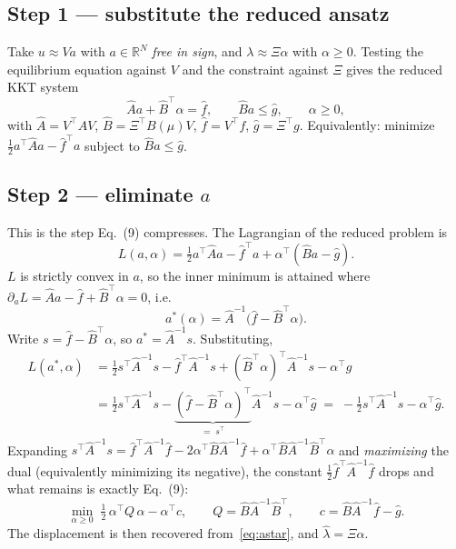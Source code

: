 \documentclass[11pt,a4paper]{article}
\newcommand{\R}{\mathbb{R}}
\begin{document}
\subsection*{Step 1 --- substitute the reduced ansatz}
Take $u\approx Va$ with $a\in\R^{N}$ \emph{free in sign}, and $\lambda\approx\Xi\alpha$
with $\alpha\ge0$. Testing the equilibrium equation against $V$ and the constraint against
$\Xi$ gives the reduced KKT system
\begin{equation}
\hat A a + \hat B^{\!\top}\alpha = \hat f,
\qquad \hat B a \le \hat g,
\qquad \alpha\ge0,
\label{eq:redKKT}
\end{equation}
with $\hat A=V^{\!\top}\!AV$, $\hat B=\Xi^{\!\top}\!B(\mu)V$, $\hat f=V^{\!\top}\!f$,
$\hat g=\Xi^{\!\top}g$. Equivalently: minimize $\tfrac12a^{\!\top}\hat Aa-\hat f^{\!\top}a$
subject to $\hat Ba\le\hat g$.

\subsection*{Step 2 --- eliminate $a$}
This is the step Eq.~(9) compresses. The Lagrangian of the reduced problem is
\begin{equation}
L(a,\alpha)=\tfrac12a^{\!\top}\hat Aa-\hat f^{\!\top}a+\alpha^{\!\top}(\hat Ba-\hat g).
\end{equation}
$L$ is strictly convex in $a$, so the inner minimum is attained where
$\partial_a L=\hat Aa-\hat f+\hat B^{\!\top}\alpha=0$, i.e.
\begin{equation}
a^{*}(\alpha)=\hat A^{-1}\bigl(\hat f-\hat B^{\!\top}\alpha\bigr).
\label{eq:astar}
\end{equation}
Write $s=\hat f-\hat B^{\!\top}\alpha$, so $a^{*}=\hat A^{-1}s$. Substituting,
\begin{align}
L(a^{*},\alpha)
&=\tfrac12 s^{\!\top}\hat A^{-1}s-\hat f^{\!\top}\hat A^{-1}s+(\hat B^{\!\top}\alpha)^{\!\top}\hat A^{-1}s-\alpha^{\!\top}\hat g \nonumber\\
&=\tfrac12 s^{\!\top}\hat A^{-1}s-\underbrace{(\hat f-\hat B^{\!\top}\alpha)^{\!\top}}_{=\;s^{\top}}\hat A^{-1}s-\alpha^{\!\top}\hat g
\;=\;-\tfrac12 s^{\!\top}\hat A^{-1}s-\alpha^{\!\top}\hat g .
\end{align}
Expanding $s^{\!\top}\hat A^{-1}s
=\hat f^{\!\top}\hat A^{-1}\hat f-2\alpha^{\!\top}\hat B\hat A^{-1}\hat f+\alpha^{\!\top}\hat B\hat A^{-1}\hat B^{\!\top}\alpha$
and \emph{maximizing} the dual (equivalently minimizing its negative), the constant
$\tfrac12\hat f^{\!\top}\hat A^{-1}\hat f$ drops and what remains is exactly Eq.~(9):
\begin{equation}
\boxed{\;\min_{\alpha\ge0}\;\tfrac12\,\alpha^{\!\top}Q\,\alpha-\alpha^{\!\top}c,
\qquad Q=\hat B\hat A^{-1}\hat B^{\!\top},
\qquad c=\hat B\hat A^{-1}\hat f-\hat g. \;}
\label{eq:dualQP}
\end{equation}
The displacement is then recovered from~\eqref{eq:astar}, and
$\hat\lambda=\Xi\alpha$.
\end{document}
